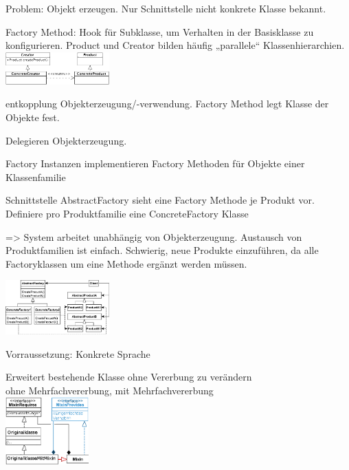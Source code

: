 
Problem: Objekt erzeugen. Nur Schnittstelle nicht konkrete Klasse bekannt. 

Factory Method: Hook für Subklasse, um Verhalten in der Basisklasse zu konfigurieren. Product und Creator bilden häufig „parallele“ Klassenhierarchien.
\includegraphics[width=0.3\textwidth]{factory}


entkopplung Objekterzeugung/-verwendung. Factory Method legt Klasse der Objekte fest. 

Delegieren Objekterzeugung.

Factory Instanzen implementieren Factory Methoden für Objekte einer Klassenfamilie

Schnittstelle AbstractFactory sieht eine Factory Methode je
Produkt vor. Definiere pro Produktfamilie eine ConcreteFactory Klasse

=> System arbeitet unabhängig von Objekterzeugung. Austausch
von Produktfamilien ist einfach. Schwierig, neue Produkte einzuführen, da alle
Factoryklassen um eine Methode ergänzt werden müssen.

\includegraphics[width=0.3\textwidth]{abstractfactory-eps-converted-to}

Vorraussetzung: Konkrete Sprache

 Erweitert bestehende Klasse ohne Vererbung zu verändern\\
\textcolor{mehrblau}{ohne Mehrfachvererbung}, \textcolor{mehrred}{mit Mehrfachvererbung}\\
\includegraphics[width=0.24\textwidth]{mixinjava}
